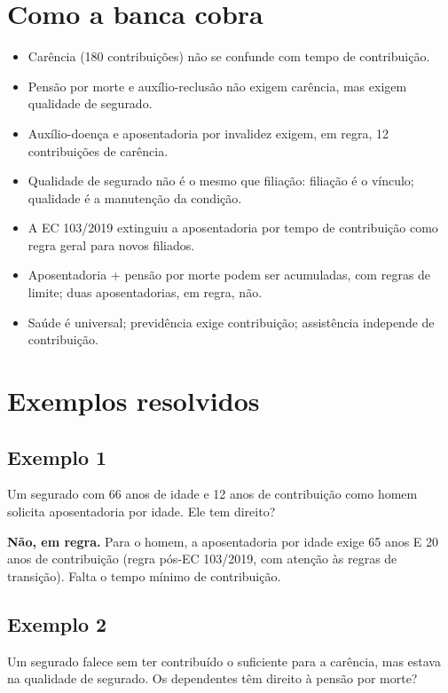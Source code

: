 \documentclass[11pt,a4paper]{article}
\begin{document}
\section*{Como a banca cobra}

\begin{itemize}
  \item Carência (180 contribuições) não se confunde com tempo de contribuição.
  \item Pensão por morte e auxílio-reclusão não exigem carência, mas exigem qualidade de segurado.
  \item Auxílio-doença e aposentadoria por invalidez exigem, em regra, 12 contribuições de carência.
  \item Qualidade de segurado não é o mesmo que filiação: filiação é o vínculo; qualidade é a manutenção da condição.
  \item A EC 103/2019 extinguiu a aposentadoria por tempo de contribuição como regra geral para novos filiados.
  \item Aposentadoria + pensão por morte podem ser acumuladas, com regras de limite; duas aposentadorias, em regra, não.
  \item Saúde é universal; previdência exige contribuição; assistência independe de contribuição.
\end{itemize}

\section*{Exemplos resolvidos}

\subsection*{Exemplo 1}

Um segurado com 66 anos de idade e 12 anos de contribuição como homem solicita aposentadoria por idade. Ele tem direito?

\textbf{Não, em regra.} Para o homem, a aposentadoria por idade exige 65 anos E 20 anos de contribuição (regra pós-EC 103/2019, com atenção às regras de transição). Falta o tempo mínimo de contribuição.

\subsection*{Exemplo 2}

Um segurado falece sem ter contribuído o suficiente para a carência, mas estava na qualidade de segurado. Os dependentes têm direito à pensão por morte?
\end{document}
